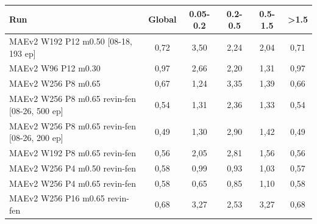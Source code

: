 \begin{tabular}{lccccc}
\toprule
Run & Global & 0.05-0.2 & 0.2-0.5 & 0.5-1.5 & >1.5 \\
\midrule
MAEv2 W192 P12 m0.50 [08-18, 193 ep] & 0,72 & 3,50 & 2,24 & 2,04 & 0,71 \\
MAEv2 W96 P12 m0.30 & 0,97 & 2,66 & 2,20 & 1,31 & 0,97 \\
MAEv2 W256 P8 m0.65 & 0,67 & 1,24 & 3,35 & 1,39 & 0,66 \\
MAEv2 W256 P8 m0.65 revin-fen [08-26, 500 ep] & 0,54 & 1,31 & 2,36 & 1,33 & 0,54 \\
MAEv2 W256 P8 m0.65 revin-fen [08-26, 200 ep] & 0,49 & 1,30 & 2,90 & 1,42 & 0,49 \\
MAEv2 W192 P8 m0.65 revin-fen & 0,56 & 2,05 & 2,81 & 1,56 & 0,56 \\
MAEv2 W256 P4 m0.50 revin-fen & 0,58 & 0,99 & 0,93 & 1,03 & 0,57 \\
MAEv2 W256 P4 m0.65 revin-fen & 0,58 & 0,65 & 0,85 & 1,10 & 0,58 \\
MAEv2 W256 P16 m0.65 revin-fen & 0,68 & 3,27 & 2,53 & 3,27 & 0,68 \\
\bottomrule
\end{tabular}
